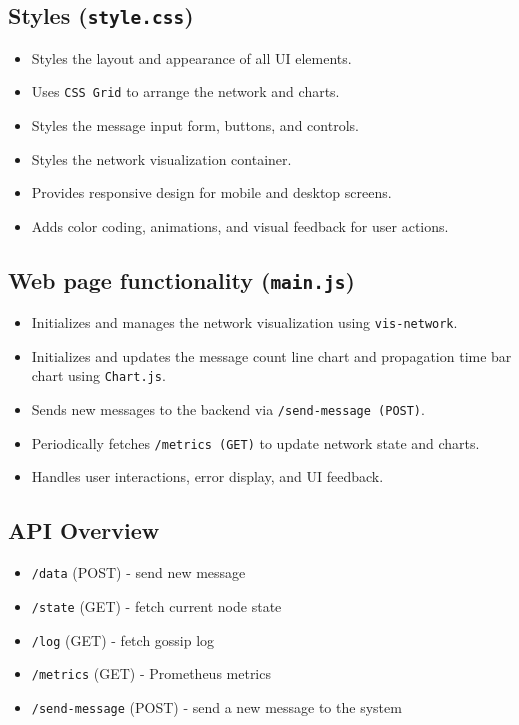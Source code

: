 \documentclass[a4paper,12pt]{article}
\begin{document}
\subsection*{Styles (\texttt{style.css})}
\begin{itemize}
    \item Styles the layout and appearance of all UI elements.
    \item Uses \verb|CSS Grid| to arrange the network and charts.
    \item Styles the message input form, buttons, and controls.
    \item Styles the network visualization container.
    \item Provides responsive design for mobile and desktop screens.
    \item Adds color coding, animations, and visual feedback for user actions.
\end{itemize}

\subsection*{Web page functionality (\texttt{main.js})}
\begin{itemize}
    \item Initializes and manages the network visualization using \verb|vis-network|.
    \item Initializes and updates the message count line chart and propagation time bar chart using \verb|Chart.js|.
    \item Sends new messages to the backend via \verb|/send-message (POST)|.
    \item Periodically fetches \verb|/metrics (GET)| to update network state and charts.
    \item Handles user interactions, error display, and UI feedback.
\end{itemize}

\subsection*{API Overview}
\begin{itemize}
    \item \texttt{/data} (POST) - send new message
    \item \texttt{/state} (GET) - fetch current node state
    \item \texttt{/log} (GET) - fetch gossip log
    \item \texttt{/metrics} (GET) - Prometheus metrics
    \item \texttt{/send-message} (POST) - send a new message to the system
\end{itemize}
\end{document}
